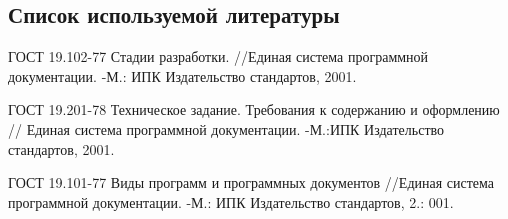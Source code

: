 \subsection*{ Список используемой литературы}
\begin{my_enumerate}

\item
ГОСТ 19.102-77 Стадии разработки. //Единая система программной документации. -М.: ИПК Издательство стандартов, 2001.

\item
ГОСТ 19.201-78 Техническое задание. Требования к содержанию и оформлению // Единая система программной документации. -М.:ИПК Издательство стандартов, 2001.

\item
ГОСТ 19.101-77 Виды программ и программных документов //Единая система программной документации. -М.: ИПК Издательство стандартов, 2.: 001.

\end{my_enumerate}

